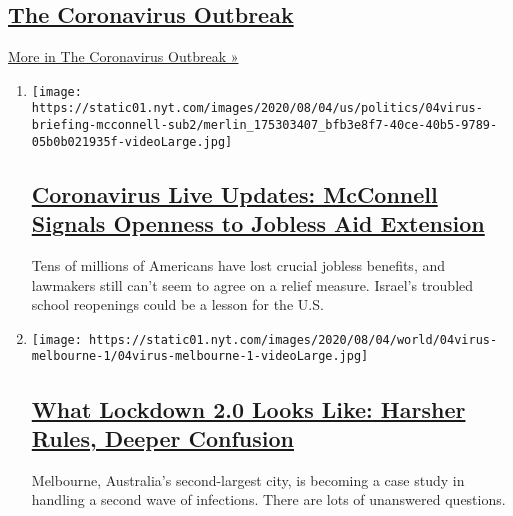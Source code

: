 \hypertarget{the-coronavirus-outbreak}{%
\subsection{\texorpdfstring{\href{/news-event/coronavirus}{The
Coronavirus
Outbreak}}{The Coronavirus Outbreak}}\label{the-coronavirus-outbreak}}

\href{/news-event/coronavirus}{More in The Coronavirus Outbreak »}

\begin{enumerate}
\def\labelenumi{\arabic{enumi}.}
\item
  \texttt{[image: https://static01.nyt.com/images/2020/08/04/us/politics/04virus-briefing-mcconnell-sub2/merlin\_175303407\_bfb3e8f7-40ce-40b5-9789-05b0b021935f-videoLarge.jpg]}

  \hypertarget{coronavirus-live-updates-mcconnell-signals-openness-to-jobless-aid-extension-1}{%
  \subsection{\texorpdfstring{\href{/2020/08/04/world/coronavirus-cases.html}{Coronavirus
  Live Updates: McConnell Signals Openness to Jobless Aid
  Extension}}{Coronavirus Live Updates: McConnell Signals Openness to Jobless Aid Extension}}\label{coronavirus-live-updates-mcconnell-signals-openness-to-jobless-aid-extension-1}}

  Tens of millions of Americans have lost crucial jobless benefits, and
  lawmakers still can't seem to agree on a relief measure. Israel's
  troubled school reopenings could be a lesson for the U.S.
\item
  \texttt{[image: https://static01.nyt.com/images/2020/08/04/world/04virus-melbourne-1/04virus-melbourne-1-videoLarge.jpg]}

  \hypertarget{what-lockdown-20-looks-like-harsher-rules-deeper-confusion-1}{%
  \subsection{\texorpdfstring{\href{/2020/08/04/world/australia/coronavirus-melbourne-lockdown.html}{What
  Lockdown 2.0 Looks Like: Harsher Rules, Deeper
  Confusion}}{What Lockdown 2.0 Looks Like: Harsher Rules, Deeper Confusion}}\label{what-lockdown-20-looks-like-harsher-rules-deeper-confusion-1}}

  Melbourne, Australia's second-largest city, is becoming a case study
  in handling a second wave of infections. There are lots of unanswered
  questions.


\end{enumerate}
